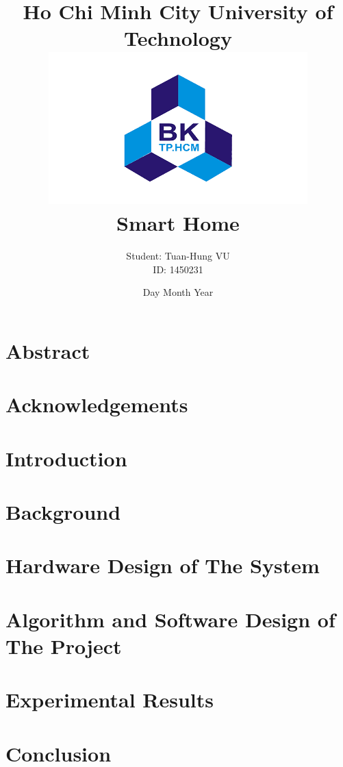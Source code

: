 \documentclass[12pt]{report}
\title{
    {\huge Ho Chi Minh City University of Technology}\\
    {\includegraphics[width=100mm, scale=0.7]{BK_logo.png}}\\
    {\huge Smart Home}\\
}
\author{Student: Tuan-Hung VU\\ID: 1450231}
\date{Day Month Year}
\begin{document}
\maketitle
\chapter*{Abstract}


\chapter*{Acknowledgements}


\tableofcontents
{%
\let\oldnumberline\numberline%
\renewcommand{\numberline}{\figurename~\oldnumberline}%
\listoffigures%
}
\listoftables
\printglossary[title={Acronym and Abbreviation}]
\newpage
\setcounter{page}{1}
\chapter{Introduction}

 
\chapter{Background}

% 
 
\chapter{Hardware Design of The System}

 
\chapter{Algorithm and Software Design of The Project}

 
\chapter{Experimental Results}


\chapter{Conclusion}

\end{document}
